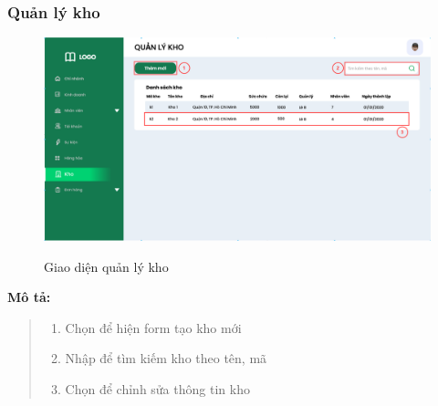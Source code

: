        \newpage
            
    \subsubsection{Quản lý kho}
        \begin{figure}[!htp]
            \centering
            \includegraphics[width=12cm]{img/UI/admin/warehouse.png}
            \label{32}
            \newline
            \caption{Giao diện quản lý kho}
        \end{figure}
        \textbf{Mô tả:}  
        \begin{quote}
            \begin{enumerate}
                \item Chọn để hiện form tạo kho mới
                \item Nhập để tìm kiếm kho theo tên, mã
                \item Chọn để chỉnh sửa thông tin kho
            \end{enumerate}
        \end{quote}
        
